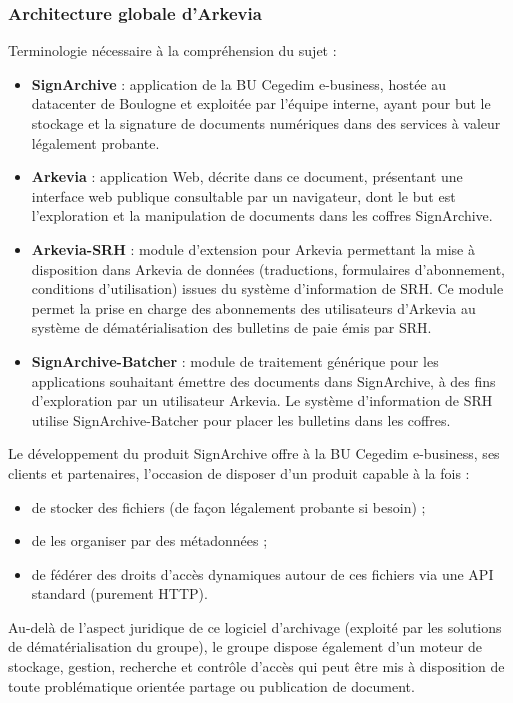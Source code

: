 \subsubsection{Architecture globale d'Arkevia}
Terminologie nécessaire à la compréhension du sujet :
\begin{beware}[title=Terminologie : ] 
   \begin{itemize}
       \item \textbf{SignArchive} : application de la BU Cegedim e-business, hostée au  datacenter de Boulogne et exploitée par l’équipe interne, ayant pour but le stockage et la signature de documents numériques dans des services à valeur légalement probante.
       \item \textbf{Arkevia} : application Web, décrite dans ce document, présentant une  interface web publique consultable par un navigateur, dont le but est l'exploration et la manipulation de documents dans les coffres SignArchive.
       \item \textbf{Arkevia-SRH} : module d'extension pour Arkevia permettant la mise à disposition dans Arkevia de données (traductions, formulaires d’abonnement, conditions  d'utilisation) issues du système d’information de SRH. Ce module permet la prise en charge des abonnements des utilisateurs d’Arkevia au système de dématérialisation des bulletins de paie émis par SRH.
       \item \textbf{SignArchive-Batcher} : module de traitement générique pour les   applications souhaitant émettre des documents dans  SignArchive, à des fins d’exploration par un utilisateur Arkevia.  Le système d’information de SRH utilise SignArchive-Batcher pour placer les bulletins dans les coffres.
   \end{itemize}
\end{beware}
Le développement du produit SignArchive offre à la BU Cegedim e-business, ses clients et partenaires, l’occasion de disposer d’un produit capable à la fois :
\begin{itemize}
    \item de stocker des fichiers (de façon légalement probante si besoin) ;\item de les organiser par des métadonnées ;
    \item de fédérer des droits d’accès dynamiques autour de ces fichiers via une API standard (purement HTTP).
\end{itemize}
Au-delà de l’aspect juridique de ce logiciel d’archivage (exploité par les solutions de dématérialisation du groupe), le groupe dispose également d’un moteur de stockage, gestion, recherche et contrôle d'accès qui peut être mis à disposition de toute problématique orientée partage ou publication de document.\\

